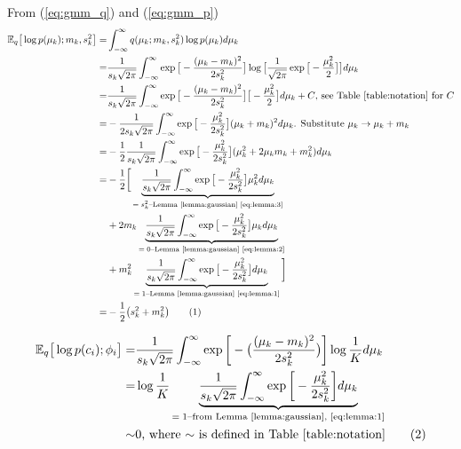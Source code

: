 \documentclass[]{article}
\newcommand{\Expectation} {\mathbb{E}}
\newcommand\numberthis    {\addtocounter{equation}{1}\tag{\theequation}}
\begin{document}
From (\ref{eq:gmm_q}) and (\ref{eq:gmm_p})
\begin{align*}
	 \Expectation_q \big[ \log {p(\mu_k);m_k,s_k^2}\big]  =& \int_{-\infty}^{\infty} q(\mu_k;m_k,s_k^2) \log {p(\mu_k)}  d\mu_k\\
	 =& \frac{1}{s_k\sqrt{2\pi}} \int_{-\infty}^{\infty} \exp{\big[-\frac{(\mu_k-m_k)^2}{2 s_k^2}\big]}\log{\big[\frac{1}{\sqrt{2\pi}} \exp{\big[- \frac{\mu_k^2}{2}\big]}\big]} d\mu_k\\
	 =&\frac{1}{s_k\sqrt{2\pi}} \int_{-\infty}^{\infty} \exp{\big[-\frac{(\mu_k-m_k)^2}{2 s_k^2}\big]}\big[ - \frac{\mu_k^2}{2}\big] d\mu_k+ C \text{, see Table \ref{table:notation} for $C$}\\
	 =& - \frac{1}{2 s_k\sqrt{2\pi}} \int_{-\infty}^{\infty} \exp{\big[-\frac{\mu_k^2}{2 s_k^2}\big]}(\mu_k+m_k)^2 d\mu_k \text{. Substitute $\mu_k \rightarrow \mu_k+m_k$}\\
	 =&- \frac{1}{2}\frac{1}{s_k\sqrt{2\pi} } \int_{-\infty}^{\infty} \exp{\big[-\frac{\mu_k^2}{2 s_k^2}\big]}(\mu_k^2 +2 \mu_k m_k + m_k^2) d\mu_k\\
	 =&- \frac{1}{2}\bigg[\underbrace{\frac{1}{s_k\sqrt{2\pi} } \int_{-\infty}^{\infty} \exp{\big[-\frac{\mu_k^2}{2 s_k^2}\big]}\mu_k^2  d\mu_k}_\text{$=s_k^2$--Lemma \ref{lemma:gaussian} \eqref{eq:lemma:3}}\\
	 \;&+2  m_k \underbrace{\frac{1}{s_k\sqrt{2\pi} } \int_{-\infty}^{\infty} \exp{\big[-\frac{\mu_k^2}{2 s_k^2}\big]} \mu_k  d\mu_k}_\text{$=0$--Lemma \ref{lemma:gaussian} \eqref{eq:lemma:2}}\\
	 \;&+m_k^2 \underbrace{\frac{1}{s_k\sqrt{2\pi} } \int_{-\infty}^{\infty} \exp{\big[-\frac{\mu_k^2}{2 s_k^2}\big]} d\mu_k}_\text{$=1$--Lemma \ref{lemma:gaussian} \eqref{eq:lemma:1}}\bigg]\\
	  =&- \frac{1}{2 } \big(s_k^2 +  m_k^2\big) \numberthis \label{eq:ELBO:1}
\end{align*}

\begin{align*}
	\Expectation_q\big[\log{p(c_i);\phi_i}\big] =& \frac{1}{s_k\sqrt{2\pi}} \int_{-\infty}^{\infty} \exp{\bigg[-\big(\frac{(\mu_k-m_k)^2}{2 s_k^2}\big)\bigg]} \log{\frac{1}{K}} d \mu_k\\
	=& \log{\frac{1}{K}} \underbrace{\frac{1}{s_k\sqrt{2\pi}} \int_{-\infty}^{\infty} \exp{\bigg[-\frac{\mu_k^2}{2 s_k^2}\bigg]}  d \mu_k}_\text{$=1$--from Lemma \ref{lemma:gaussian}, \eqref{eq:lemma:1}}\\
	\sim & 0 \text{, where $\sim$ is defined in Table \ref{table:notation}}\numberthis \label{eq:ELBO:2}
\end{align*}
\end{document}
